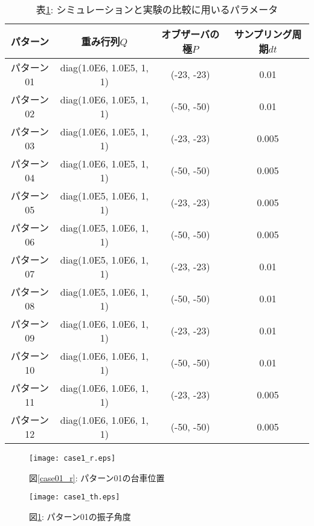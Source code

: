 \begin{table}[htbp]
	\begin{center}
    \caption{表\ref{sim_exp}: シミュレーションと実験の比較に用いるパラメータ}
		\begin{tabular}{|c|c|c|c|} \hline
			パターン & 重み行列$Q$ & オブザーバの極$P$ & サンプリング周期$dt$ \\ \hline\hline
			パターン01 & diag(1.0E6, 1.0E5, 1, 1) & (-23, -23) & 0.01  \\ \hline
			パターン02 & diag(1.0E6, 1.0E5, 1, 1) & (-50, -50) & 0.01  \\ \hline
			パターン03 & diag(1.0E6, 1.0E5, 1, 1) & (-23, -23) & 0.005 \\ \hline
			パターン04 & diag(1.0E6, 1.0E5, 1, 1) & (-50, -50) & 0.005 \\ \hline
			パターン05 & diag(1.0E5, 1.0E6, 1, 1) & (-23, -23) & 0.005 \\ \hline
			パターン06 & diag(1.0E5, 1.0E6, 1, 1) & (-50, -50) & 0.005 \\ \hline
			パターン07 & diag(1.0E5, 1.0E6, 1, 1) & (-23, -23) & 0.01  \\ \hline
			パターン08 & diag(1.0E5, 1.0E6, 1, 1) & (-50, -50) & 0.01  \\ \hline
			パターン09 & diag(1.0E6, 1.0E6, 1, 1) & (-23, -23) & 0.01  \\ \hline
			パターン10 & diag(1.0E6, 1.0E6, 1, 1) & (-50, -50) & 0.01  \\ \hline
			パターン11 & diag(1.0E6, 1.0E6, 1, 1) & (-23, -23) & 0.005 \\ \hline
			パターン12 & diag(1.0E6, 1.0E6, 1, 1) & (-50, -50) & 0.005 \\ \hline
		\end{tabular}
		\label{sim_exp}
	\end{center}
\end{table}

\begin{figure}[htbp]
    \begin{minipage}{0.5\hsize}
        \begin{center}
            \texttt{[image: case1\_r.eps]}
            \caption{図\ref{case01_r}: パターン01の台車位置}
            \label{case01_r}
        \end{center}
    \end{minipage}
    \begin{minipage}{0.5\hsize}
        \begin{center}
            \texttt{[image: case1\_th.eps]}
            \caption{図\ref{case01_th}: パターン01の振子角度}
            \label{case01_th}
        \end{center}
    \end{minipage}
\end{figure}

